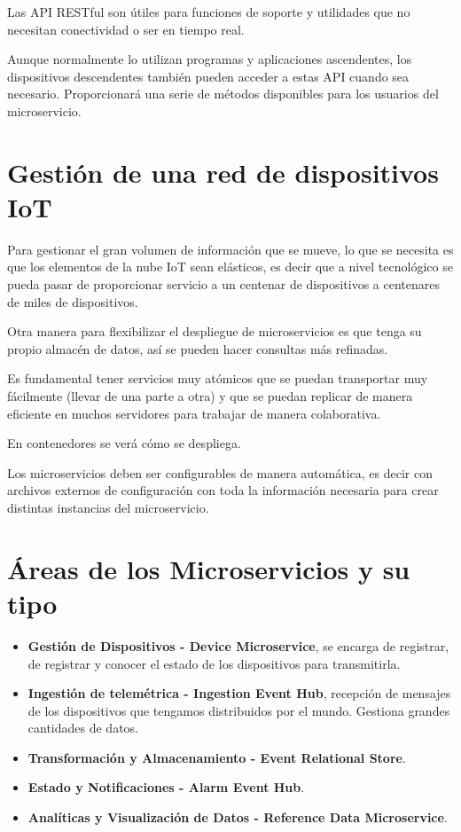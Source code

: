 \documentclass[12pt, twoside, openright]{report} %
\begin{document}
Las API RESTful son útiles para funciones de soporte y utilidades que no necesitan conectividad o ser en tiempo real.

Aunque normalmente lo utilizan programas y aplicaciones ascendentes, los dispositivos descendentes también pueden acceder a estas API cuando sea necesario. Proporcionará una serie de métodos disponibles para los usuarios del microservicio.


\section{Gestión de una red de dispositivos IoT}
Para gestionar el gran volumen de información que se mueve, lo que se necesita es que los elementos de la nube IoT sean elásticos, es decir que a nivel tecnológico se pueda pasar de proporcionar servicio a un centenar de dispositivos a centenares de miles de dispositivos.

Otra manera para flexibilizar el despliegue de microservicios es que tenga su propio almacén de datos, así se pueden hacer consultas más refinadas.

Es fundamental tener servicios muy atómicos que se puedan transportar muy fácilmente (llevar de una parte a otra) y que se puedan replicar de manera eficiente en muchos servidores para trabajar de manera colaborativa.

En contenedores se verá cómo se despliega.

Los microservicios deben ser configurables de manera automática, es decir con archivos externos de configuración con toda la información necesaria para crear distintas instancias del microservicio.

\section{Áreas de los Microservicios y su tipo}
\begin{itemize}
	\item \textbf{Gestión de Dispositivos - Device Microservice}, se encarga de registrar, de registrar y conocer el estado de los dispositivos para transmitirla.
	\item \textbf{Ingestión de telemétrica - Ingestion Event Hub}, recepción de mensajes de los dispositivos que tengamos distribuidos por el mundo. Gestiona grandes cantidades de datos.
	\item \textbf{Transformación y Almacenamiento - Event Relational Store}.
	\item \textbf{Estado y Notificaciones - Alarm Event Hub}.
	\item \textbf{Analíticas y Visualización de Datos - Reference Data Microservice}.
\end{itemize}
\end{document}
